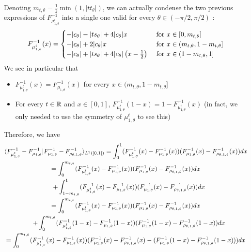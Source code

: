     Denoting $m_{t,\theta} = \frac{1}{2} \min(1, |tt_\theta|)$, we can actually condense the two previous expressions of $F^{-1}_{\mu^t_{1,\theta}}$ into a single one valid for every $\theta \in (-\pi/2,\pi/2)$ : 
    \begin{equation}
        \label{eq:quantile_segment_t_theta}
        F^{-1}_{\mu^t_{1,\theta}}(x) = 
        \begin{cases} 
        -|c_\theta| - |t s_\theta| + 4 |c_\theta| x 
        & \hbox{ for } x\in [0, m_{t,\theta}]\\
        -|c_\theta| + 2|c_\theta|x
        & \hbox{ for } x\in (m_{t,\theta}, 1-m_{t,\theta}] \\
        -|c_\theta| + |t s_\theta| + 4|c_\theta|\left(x - \frac{1}{2}\right)
        & \hbox{ for } x\in (1-m_{t,\theta}, 1]\\
        \end{cases}
    \end{equation}
    We see in particular that
    \begin{itemize}
        \item $F^{-1}_{\mu^t_{1,\theta}}(x) = F^{-1}_{\mu_{1,\theta}}(x)$ for every $x \in (m_{t,\theta}, 1-m_{t,\theta}]$
        \item For every $t \in \mathbb R$ and $x \in [0,1]$, $F^{-1}_{\mu^t_{1,\theta}}(1-x) = 1 - F^{-1}_{\mu^t_{1,\theta}}(x)$ (in fact, we only needed to use the symmetry of $\mu^t_{1,\theta}$ to see this)
    \end{itemize}
    Therefore, we have
    \begin{multline}
        \langle F^{-1}_{\mu^t_{1,\theta}} - F^{-1}_{\mu_{1,\theta}}|F^{-1}_{\mu_{1,\theta}} - F^{-1}_{\rho_{\theta,1,\theta}}\rangle_{L^2([0,1])} 
        = \int_0^1 (F^{-1}_{\mu^t_{1,\theta}}(x) - F^{-1}_{\mu_{1,\theta}}(x))(F^{-1}_{\mu_{1,\theta}}(x) - F^{-1}_{\rho_{\theta,1,\theta}}(x))dx \\
        = \int_0^{m_{t,\theta}} (F^{-1}_{\mu^t_{1,\theta}}(x) - F^{-1}_{\mu_{1,\theta}}(x))(F^{-1}_{\mu_{1,\theta}}(x) - F^{-1}_{\rho_{\theta,1,\theta}}(x))dx \notag \\ 
        \quad + \int_{1-m_{t,\theta}}^1 (F^{-1}_{\mu^t_{1,\theta}}(x) - F^{-1}_{\mu_{1,\theta}}(x))(F^{-1}_{\mu_{1,\theta}}(x) - F^{-1}_{\rho_{\theta,1,\theta}}(x))dx \\
        = \int_0^{m_{t,\theta}} (F^{-1}_{\mu^t_{1,\theta}}(x) - F^{-1}_{\mu_{1,\theta}}(x))(F^{-1}_{\mu_{1,\theta}}(x) - F^{-1}_{\rho_{\theta,1,\theta}}(x))dx \notag \\ 
        \quad + \int_0^{m_{t,\theta}} (F^{-1}_{\mu^t_{1,\theta}}(1-x) - F^{-1}_{\mu_{1,\theta}}(1-x))(F^{-1}_{\mu_{1,\theta}}(1-x) - F^{-1}_{\rho_{\theta,1,\theta}}(1-x))dx \\
        = \int_0^{m_{t,\theta}} (F^{-1}_{\mu^t_{1,\theta}}(x) - F^{-1}_{\mu_{1,\theta}}(x))(F^{-1}_{\mu_{1,\theta}}(x) - F^{-1}_{\rho_{\theta,1,\theta}}(x) - (F^{-1}_{\mu_{1,\theta}}(1-x) - F^{-1}_{\rho_{\theta,1,\theta}}(1-x)))dx
    \end{multline}
